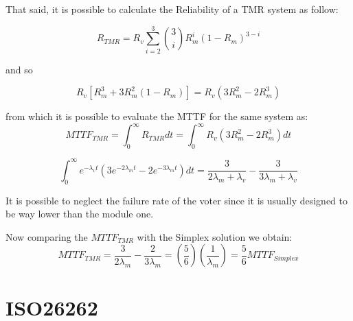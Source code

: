 \documentclass[./dissertation.tex]{subfiles}
\begin{document}
That said, it is possible to calculate the Reliability of a TMR system as follow:

\begin{equation}
    R_{TMR} = R_v \sum_{i=2}^{3} \binom{3}{i} R^i_m (1-R_m)^{3-i}
\end{equation}

and so 

\begin{equation}
    R_v [R_m^3 + 3R_m^2(1-R_m)] = R_v(3R^2_m - 2R_m^3)
\end{equation}

from which it is possible to evaluate the MTTF for the same system as:
\begin{equation}
MTTF_{TMR} = \int_0^{\infty}R_{TMR} dt = \int_0^{\infty}R_v (3R^2_m -2R^3_m)dt 
\end{equation}

\begin{equation}
\int_0^{\infty} e^{-\lambda_v t}\left( 3e^{-2\lambda_m t} -2e^{-3\lambda_m t}  \right) dt = \frac{3}{2\lambda_m + \lambda_v} - \frac{3}{3\lambda_m + \lambda_v}
\end{equation} 

It is possible to neglect the failure rate of the voter since it is usually designed to be way lower than the module one.

Now comparing the $MTTF_{TMR}$ with the Simplex solution we obtain:
\begin{equation}
    MTTF_{TMR} = \frac{3}{2\lambda_m} - \frac{2}{3\lambda_m} = \left( \frac{5}{6}\right) \left( \frac{1}{\lambda_m}\right) = \frac{5}{6} MTTF_{Simplex}
\end{equation}
\label{sec:iniziare}


\chapter{ISO26262}
\end{document}
